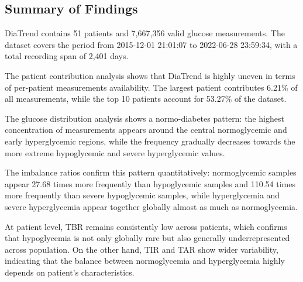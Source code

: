 \subsection{Summary of Findings}
\label{subsec:diatrend_summary}

DiaTrend contains 51 patients and 7,667,356 valid glucose measurements. The dataset covers the period from 2015-12-01 21:01:07 to 2022-06-28 23:59:34, with a total recording span of 2,401 days.

The patient contribution analysis shows that DiaTrend is highly uneven in terms of per-patient measurements availability. The largest patient contributes 6.21\% of all measurements, while the top 10 patients account for 53.27\% of the dataset.

The glucose distribution analysis shows a normo-diabetes pattern: the highest concentration of measurements appears around the central normoglycemic and early hyperglycemic regions, while the frequency gradually decreases towards the more extreme hypoglycemic and severe hyperglycemic values.

The imbalance ratios confirm this pattern quantitatively: normoglycemic samples appear 27.68 times more frequently than hypoglycemic samples and 110.54 times more frequently than severe hypoglycemic samples, while hyperglycemia and severe hyperglycemia appear together globally almost as much as normoglycemia.

At patient level, TBR remains consistently low across patients, which confirms that hypoglycemia is not only globally rare but also generally underrepresented across population. On the other hand, TIR and TAR show wider variability, indicating that the balance between normoglycemia and hyperglycemia highly depends on patient's characteristics.